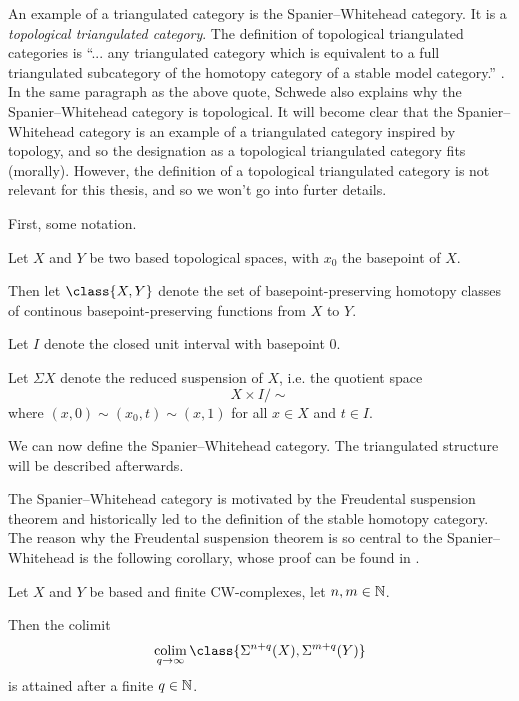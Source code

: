 An example of a triangulated category is the Spanier--Whitehead category. It is a \emph{topological triangulated category}. The definition of topological triangulated categories is ``... any triangulated category which is equivalent to a full triangulated subcategory of the homotopy category of a stable model category.'' \cite[At the top of p. 6 in the standalone article]{Schwede_2010}. In the same paragraph as the above quote, Schwede also explains why the Spanier--Whitehead category is topological. It will become clear that the Spanier--Whitehead category is an example of a triangulated category inspired by topology, and so the designation as a topological triangulated category fits (morally). However, the definition of a topological triangulated category is not relevant for this thesis, and so we won't go into furter details. 

First, some notation.
\begin{notation}
    Let \( X \) and \( Y \) be two based topological spaces, with \(x_0 \) the basepoint of \( X \).

    Then let \( \class{ X, Y } \) denote the set of basepoint-preserving homotopy classes of continous basepoint-preserving functions from \( X \) to \( Y \).

    Let \( I \) denote the closed unit interval with basepoint \( 0 \).

    Let \( \Sigma X \) denote the reduced suspension of \( X \), i.e. the quotient space
    \[
        X \times I / \sim
    \]
    where \( (x, 0) \sim (x_0, t) \sim (x, 1) \) for all \( x \in X \)  and \( t \in I \).
\end{notation}

We can now define the Spanier--Whitehead category. The triangulated structure will be described afterwards.

The Spanier--Whitehead category is motivated by the Freudental suspension theorem and historically led to the definition of the stable homotopy category. The reason why the Freudental suspension theorem is so central to the Spanier--Whitehead is the following corollary, whose proof can be found in \cite[Remark 5.2]{Daria_Bachelor}.

\begin{corollary}
    \label{cor:sw_freudenthal_suspension}
    Let \( X \) and \( Y \) be based and finite CW-complexes, let \( n, m \in {\mathbb{N}} \).
    
    Then the colimit
    \[
        \colim_{q \to \infty} \class{ \Sigma^{n + q}(X), \Sigma^{m + q}(Y) }
    \]
    is attained after a finite \( q \in {\mathbb{N}} \).
\end{corollary}

